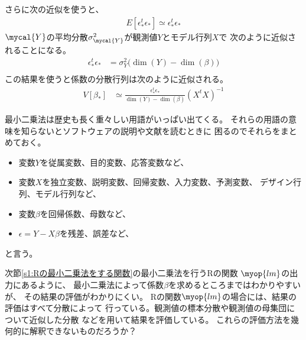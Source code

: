 	さらに次の近似を使うと、
	\begin{equation*}\begin{split} %
		E[\epsilon_*^t\epsilon_*] \simeq \epsilon_*^t\epsilon_*
	\end{split}\end{equation*} %
	$\mycal{Y}$の平均分散$\sigma_\mycal{Y}^2$が観測値$Y$とモデル行列$X$で
	次のように近似されることになる。
	\begin{equation}\begin{split} %
		\epsilon_*^t\epsilon_*
		&= \sigma_Y^2\bigl(\dim(Y)-\dim(\beta)\bigr) \\
	\end{split}\end{equation} %
	この結果を使うと係数の分散行列は次のように近似される。
	\begin{equation}\label{eq:approx.beta.variance}\begin{split} %
		V[\beta_*]
		&\simeq \frac{\epsilon_*^t\epsilon_*}{\dim(Y)-\dim(\beta)}
			(X^tX)^{-1}
	\end{split}\end{equation} %

	最小二乗法は歴史も長く重々しい用語がいっぱい出てくる。
	それらの用語の意味を知らないとソフトウェアの説明や文献を読むときに
	困るのでそれらをまとめておく。
	\begin{itemize}\setlength{\itemsep}{-1mm} %
		\item 変数$Y$を従属変数、目的変数、応答変数など、
		\item 変数$X$を独立変数、説明変数、回帰変数、入力変数、予測変数、
		デザイン行列、モデル行列など、
		\item 変数$\beta$を回帰係数、母数など、
		\item $\epsilon=Y-X\beta$を残差、誤差など、
	\end{itemize} %
	と言う。

	\begin{todo}[結果の評価]\label{todo:結果の評価} %
		次節\ref{s1:Rの最小二乗法をする関数}の最小二乗法を行うRの関数
		$\myop{lm}$の出力にあるように、
		最小二乗法によって係数$\beta$を求めるところまではわかりやすいが、
		その結果の評価がわかりにくい。
		Rの関数$\myop{lm}$の場合には、結果の評価はすべて分散によって
		行っている。観測値の標本分散や観測値の母集団について近似した分散
		などを用いて結果を評価している。
		これらの評価方法を幾何的に解釈できないものだろうか？
	\end{todo} %

